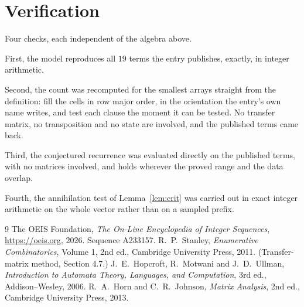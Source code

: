 \documentclass[11pt,a4paper]{article}
\theoremstyle{plain}
\theoremstyle{definition}
\begin{document}
\section{Verification}

Four checks, each independent of the algebra above.

First, the model reproduces all $19$ terms the entry publishes, exactly, in integer
arithmetic.

Second, the count was recomputed for the smallest arrays straight from the definition: fill the
cells in row major order, in the orientation the entry's own name writes, and test each clause
the moment it can be tested. No transfer matrix, no transposition and no state are involved,
and the published terms came back.

Third, the conjectured recurrence was evaluated directly on the published terms, with no
matrices involved, and holds wherever the proved range and the data overlap.

Fourth, the annihilation test of Lemma~\ref{lem:crit} was carried out in exact integer
arithmetic on the whole vector rather than on a sampled prefix.

\begin{thebibliography}{9}
 The OEIS Foundation, \emph{The On-Line Encyclopedia of Integer
Sequences}, \url{https://oeis.org}, 2026. Sequence A233157.
 R.~P.~Stanley, \emph{Enumerative Combinatorics}, Volume 1, 2nd ed.,
Cambridge University Press, 2011. (Transfer-matrix method, Section 4.7.)
 J.~E.~Hopcroft, R.~Motwani and J.~D.~Ullman, \emph{Introduction to Automata
Theory, Languages, and Computation}, 3rd ed., Addison--Wesley, 2006.
 R.~A.~Horn and C.~R.~Johnson, \emph{Matrix Analysis}, 2nd ed., Cambridge
University Press, 2013.
\end{thebibliography}
\end{document}
